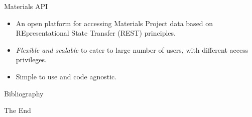 \documentclass[aspectratio=169]{beamer}
\begin{document}
\begin{frame}{Materials API}
\begin{itemize}
    \item An open platform for accessing Materials Project data based on REpresentational State Transfer (REST) principles.
    \item \textit{Flexible and scalable} to cater to large number of users, with different access privileges.
    \item Simple to use and code agnostic.
\end{itemize}
\end{frame}


\begin{frame}[allowframebreaks]{Bibliography}
    
    
\end{frame}


\begin{frame}
    \Huge{\centerline{The End}}
\end{frame}
\end{document}
